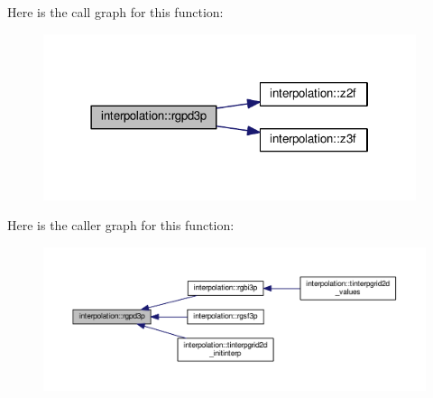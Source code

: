Here is the call graph for this function\+:
\nopagebreak
\begin{figure}[H]
\begin{center}
\leavevmode
\includegraphics[width=310pt]{namespaceinterpolation_a20aedcecd7b269f068dfe4fcce012458_cgraph}
\end{center}
\end{figure}
Here is the caller graph for this function\+:
\nopagebreak
\begin{figure}[H]
\begin{center}
\leavevmode
\includegraphics[width=350pt]{namespaceinterpolation_a20aedcecd7b269f068dfe4fcce012458_icgraph}
\end{center}
\end{figure}
\mbox{\label{namespaceinterpolation_ab2d80355a943b73b1de2cef700693500}} 
